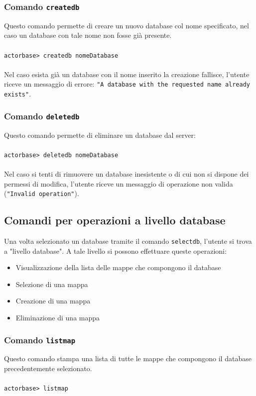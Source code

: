 \documentclass[a4paper]{article}
\begin{document}
	\subsubsection{Comando \texttt{createdb}}
	Questo comando permette di creare un nuovo database col nome specificato, nel caso  un database con tale nome non fosse già presente.
	\\ \\
	\texttt{actorbase>	createdb nomeDatabase}
	\\ \\
	Nel caso esista già un database con il nome inserito la creazione fallisce, l'utente riceve un messaggio di errore: \texttt{"A database with the requested name already exists"}.

	\subsubsection{Comando \texttt{deletedb}}
	Questo comando permette di eliminare un database dal server:
	\\ \\
	\texttt{actorbase>	deletedb nomeDatabase}
	\\ \\
	Nel caso si tenti di rimuovere un database inesistente o di cui non si dispone dei permessi di modifica, l'utente riceve un messaggio di operazione non valida (\texttt{"Invalid operation"}).
	

	\subsection{Comandi per operazioni a livello database}
	Una volta selezionato un database tramite il comando \texttt{selectdb}, l'utente si trova a "livello database". A tale livello si possono effettuare queste operazioni:
	\begin{itemize}
		\item Visualizzazione della lista delle mappe che compongono il database
		\item Selezione di una mappa
		\item Creazione di una mappa
		\item Eliminazione di una mappa
	\end{itemize}

	\subsubsection{Comando \texttt{listmap}}
	Questo comando stampa una lista di tutte le mappe che compongono il database precedentemente selezionato.
	\\ \\
	\texttt{actorbase>	listmap}
\end{document}
